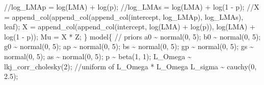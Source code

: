 \documentclass[
  12pt,
  letterpaper,
  DIV=11,
  numbers=noendperiod]{scrartcl}
\newenvironment{Shaded}{\begin{snugshade}}{\end{snugshade}}
\newcommand{\CommentTok}[1]{\textcolor[rgb]{0.37,0.37,0.37}{#1}}
\newcommand{\DecValTok}[1]{\textcolor[rgb]{0.68,0.00,0.00}{#1}}
\newcommand{\FloatTok}[1]{\textcolor[rgb]{0.68,0.00,0.00}{#1}}
\newcommand{\KeywordTok}[1]{\textcolor[rgb]{0.00,0.23,0.31}{#1}}
\newcommand{\NormalTok}[1]{\textcolor[rgb]{0.00,0.23,0.31}{#1}}
\begin{document}
\begin{Shaded}
\begin{Highlighting}[]
  \CommentTok{//log\_LMAp = log(LMA) + log(p);}
  \CommentTok{//log\_LMAs = log(LMA) + log(1 {-} p);}
  \CommentTok{//X = append\_col(append\_col(append\_col(intercept, log\_LMAp), log\_LMAs), leaf);}
\NormalTok{  X = append\_col(append\_col(intercept, log(LMA) + log(p)), log(LMA) + log(}\DecValTok{1}\NormalTok{ {-} p));}
\NormalTok{  Mu = X * Z;}
\NormalTok{\}}
\KeywordTok{model}\NormalTok{\{}
  \CommentTok{// priors}
\NormalTok{  a0 \textasciitilde{} normal(}\DecValTok{0}\NormalTok{, }\DecValTok{5}\NormalTok{);}
\NormalTok{  b0 \textasciitilde{} normal(}\DecValTok{0}\NormalTok{, }\DecValTok{5}\NormalTok{);}
\NormalTok{  g0 \textasciitilde{} normal(}\DecValTok{0}\NormalTok{, }\DecValTok{5}\NormalTok{);}
\NormalTok{  ap \textasciitilde{} normal(}\DecValTok{0}\NormalTok{, }\DecValTok{5}\NormalTok{);}
\NormalTok{  bs \textasciitilde{} normal(}\DecValTok{0}\NormalTok{, }\DecValTok{5}\NormalTok{);}
\NormalTok{  gp \textasciitilde{} normal(}\DecValTok{0}\NormalTok{, }\DecValTok{5}\NormalTok{);}
\NormalTok{  gs \textasciitilde{} normal(}\DecValTok{0}\NormalTok{, }\DecValTok{5}\NormalTok{);}
\NormalTok{  as \textasciitilde{} normal(}\DecValTok{0}\NormalTok{, }\DecValTok{5}\NormalTok{);}
\NormalTok{  p \textasciitilde{} beta(}\DecValTok{1}\NormalTok{, }\DecValTok{1}\NormalTok{);}
\NormalTok{  L\_Omega \textasciitilde{} lkj\_corr\_cholesky(}\DecValTok{2}\NormalTok{); }\CommentTok{//uniform of L\_Omega * L\_Omega\textquotesingle{}}
\NormalTok{  L\_sigma \textasciitilde{} cauchy(}\DecValTok{0}\NormalTok{, }\FloatTok{2.5}\NormalTok{);}


\end{Highlighting}
\end{Shaded}
\end{document}
